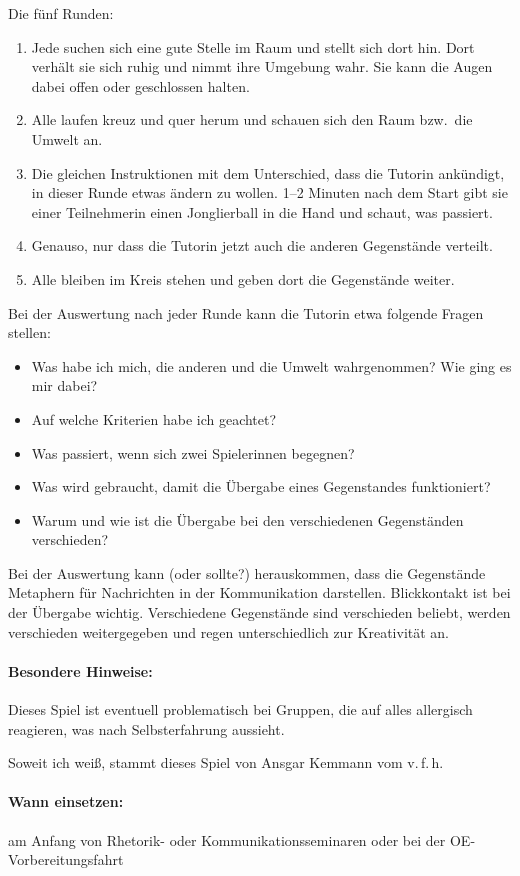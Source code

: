 Die fünf Runden:
  \begin{enumerate}
    \item Jede suchen sich eine gute Stelle im Raum und stellt sich dort hin. Dort verhält sie sich ruhig und nimmt ihre Umgebung wahr. Sie kann die Augen dabei offen oder geschlossen halten.
    \item Alle laufen kreuz und quer herum und schauen sich den Raum bzw.~die Umwelt an.
    \item Die gleichen Instruktionen mit dem Unterschied, dass die Tutorin ankündigt, in dieser Runde etwas ändern zu wollen. 1--2 Minuten nach dem Start gibt sie einer Teilnehmerin einen Jonglierball in die Hand und schaut, was passiert.
    \item Genauso, nur dass die Tutorin jetzt auch die anderen Gegenstände verteilt.
    \item Alle bleiben im Kreis stehen und geben dort die Gegenstände weiter.
  \end{enumerate}
  Bei der Auswertung nach jeder Runde kann die Tutorin etwa folgende Fragen stellen:
  \begin{itemize}
    \item Was habe ich mich, die anderen und die Umwelt wahrgenommen? Wie ging es mir dabei?
    \item Auf welche Kriterien habe ich geachtet?
    \item Was passiert, wenn sich zwei Spielerinnen begegnen?
    \item Was wird gebraucht, damit die Übergabe eines Gegenstandes funktioniert?
    \item Warum und wie ist die Übergabe bei den verschiedenen Gegenständen verschieden?
  \end{itemize}
  Bei der Auswertung kann (oder sollte?) herauskommen, dass die Gegenstände Metaphern für Nachrichten in der Kommunikation darstellen. Blickkontakt ist bei der Übergabe wichtig. Verschiedene Gegenstände sind verschieden beliebt, werden verschieden weitergegeben und regen unterschiedlich zur Kreativität an.
\paragraph{Besondere Hinweise:} Dieses Spiel ist eventuell problematisch bei Gruppen, die auf alles allergisch reagieren, was nach Selbsterfahrung aussieht.

Soweit ich weiß, stammt dieses Spiel von Ansgar Kemmann vom v.\,f.\,h.
\paragraph{Wann einsetzen:} am Anfang von Rhetorik- oder Kommunikationsseminaren oder bei der OE-Vorbereitungsfahrt

